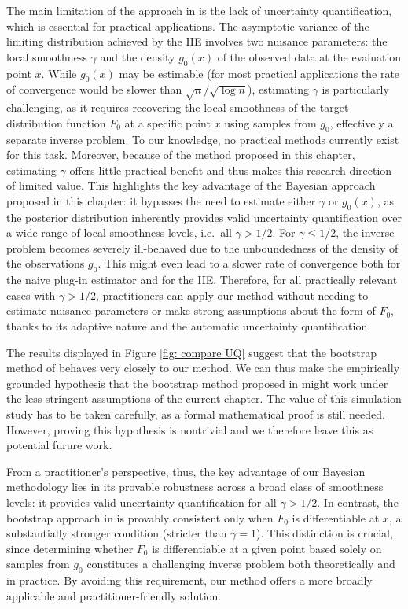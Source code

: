 The main limitation of the approach in \cite{27} is the lack of uncertainty quantification, which is essential for practical applications. The asymptotic variance of the limiting distribution achieved by the IIE involves two nuisance parameters: the local smoothness $\gamma$ and the density $g_0(x)$ of the observed data at the evaluation point $x$. While $g_0(x)$ may be estimable (for most practical applications the rate of convergence would be slower than $\sqrt{n}/\sqrt{\log n}$), estimating $\gamma$ is particularly challenging, as it requires recovering the local smoothness of the target distribution function $F_0$ at a specific point $x$ using samples from $g_0$, effectively a separate inverse problem. To our knowledge, no practical methods currently exist for this task. Moreover, because of the method proposed in this chapter, estimating $\gamma$ offers little practical benefit and thus makes this research direction of limited value. This highlights the key advantage of the Bayesian approach proposed in this chapter: it bypasses the need to estimate either $\gamma$ or $g_0(x)$, as the posterior distribution inherently provides valid uncertainty quantification over a wide range of local smoothness levels, i.e.\ all $\gamma > 1/2$. For $\gamma \leq 1/2$, the inverse problem becomes severely ill-behaved due to the unboundedness of the density of the observations $g_0$. This might even lead to a slower rate of convergence both for the naive plug-in estimator and for the IIE. Therefore, for all practically relevant cases with $\gamma > 1/2$, practitioners can apply our method without needing to estimate nuisance parameters or make strong assumptions about the form of $F_0$, thanks to its adaptive nature and the automatic uncertainty quantification.


The results displayed in Figure \ref{fig: compare UQ} suggest that the bootstrap method of \cite{19} behaves very closely to our method. We can thus make the empirically grounded hypothesis that the bootstrap method proposed in \cite{19} might work under the less stringent assumptions of the current chapter. The value of this simulation study has to be taken carefully, as a formal mathematical proof is still needed. However, proving this hypothesis is nontrivial and we therefore leave this as potential furure work. 

From a practitioner's perspective, thus, the key advantage of our Bayesian methodology lies in its provable robustness across a broad class of smoothness levels: it provides valid uncertainty quantification for all $\gamma > 1/2$. In contrast, the bootstrap approach in \cite{19} is provably consistent only when $F_0$ is differentiable at $x$, a substantially stronger condition (stricter than $\gamma = 1$). This distinction is crucial, since determining whether $F_0$ is differentiable at a given point based solely on samples from $g_0$ constitutes a challenging inverse problem both theoretically and in practice. By avoiding this requirement, our method offers a more broadly applicable and practitioner-friendly solution.







